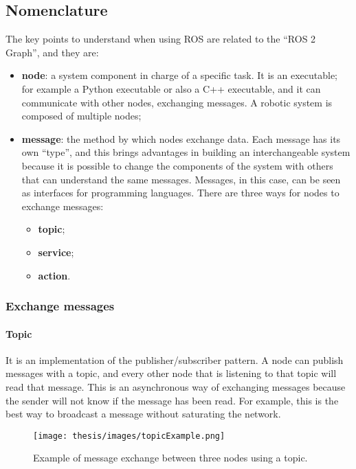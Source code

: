 \documentclass[../thesis.tex]{subfiles}
\begin{document}
\subsection{Nomenclature}
The key points to understand when using \acrshort{ROS} are related to the ``ROS 2 Graph'', and they are:
\begin{itemize}
    \item \textbf{node}: a system component in charge of a specific task. It is an executable; for example a Python executable or also a C++ executable, and it can communicate with other nodes, exchanging messages. A robotic system is composed of multiple nodes; 
    \item \textbf{message}: the method by which nodes exchange data. Each message has its own ``type'', and this brings advantages in building an interchangeable system because it is possible to change the components of the system with others that can understand the same messages. Messages, in this case, can be seen as interfaces for programming languages. There are three ways for nodes to exchange messages: 
        \begin{itemize}
            \item \textbf{topic};
            \item \textbf{service};
            \item \textbf{action}.
        \end{itemize}
\end{itemize}

\subsubsection{Exchange messages}\label{sss:exchange_messages}
\paragraph{Topic}\label{p:exchange_message_with_topics}
It is an implementation of the publisher/subscriber pattern. A node can publish messages with a topic, and every other node that is listening to that topic will read that message. This is an asynchronous way of exchanging messages because the sender will not know if the message has been read. For example, this is the best way to broadcast a message without saturating the network. 
\begin{figure}[H]
    \centering
    \texttt{[image: thesis/images/topicExample.png]}
    \caption{Example of message exchange between three nodes using a topic.}
    \label{fig:exampleTopicExchangeMessage}
\end{figure}
\end{document}
